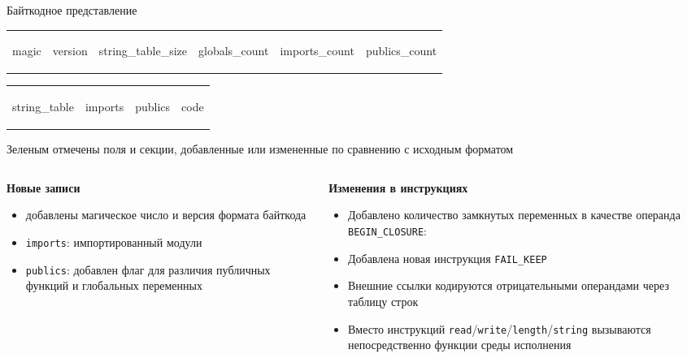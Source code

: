 \documentclass
  [ russian
  , aspectratio=1610
  ] {beamer}
\begin{document}
\begin{frame}{Байткодное представление}
    \centering
    \scriptsize
    \setlength{\tabcolsep}{2pt}
    \renewcommand{\arraystretch}{1.15}
    \begin{tabular}{cccccc}
        \colorbox{green!17}{\strut magic} &
        \colorbox{green!17}{\strut version} &
        \colorbox{gray!12}{\strut string\_table\_size} &
        \colorbox{gray!12}{\strut globals\_count} &
        \colorbox{green!17}{\strut imports\_count} &
        \colorbox{gray!12}{\strut publics\_count}
    \end{tabular}

    \vspace{0.35em}

    \begin{tabular}{cccc}
        \colorbox{gray!12}{\strut string\_table} &
        \colorbox{green!17}{\strut imports} &
        \colorbox{green!17}{\strut publics} &
        \colorbox{gray!12}{\strut code}
    \end{tabular}

    \vspace{0.5em}

    \footnotesize
    Зеленым отмечены поля и секции, добавленные или измененные по сравнению с исходным форматом

    \vspace{0.8em}

    \begin{columns}[t]
        \begin{column}{0.46\linewidth}
            \textbf{Новые записи}
            \begin{itemize}
                \item добавлены магическое число и версия формата байткода
                \item \texttt{imports}: импортированный модули
                \item \texttt{publics}: добавлен флаг для различия публичных функций и глобальных переменных
            \end{itemize}
        \end{column}
        \begin{column}{0.5\linewidth}
            \textbf{Изменения в инструкциях}
            \begin{itemize}
                \item  Добавлено количество замкнутых переменных в качестве операнда
                  \texttt{BEGIN\_CLOSURE}:
                \item Добавлена новая инструкция \texttt{FAIL\_KEEP}
                \item Внешние ссылки кодируются отрицательными операндами через таблицу строк
                \item Вместо инструкций \texttt{read}/\texttt{write}/\texttt{length}/\texttt{string} вызываются непосредственно функции среды исполнения
            \end{itemize}
        \end{column}
    \end{columns}
\end{frame}
\end{document}
